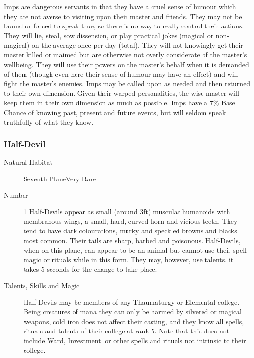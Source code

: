\begin{multicols}{2}
\begin{description}
\setlength\itemsep{0pt}

\item[Comments]Imps are dangerous servants in that they have a cruel sense
of humour which they are not averse to visiting upon their master and
friends.  They may not be bound or forced to speak true, so there is
no way to really control their actions.  They will lie, steal, sow
dissension, or play practical jokes (magical or non-magical) on the
average once per day (total).  They will not knowingly get their
master killed or maimed but are otherwise not overly considerate of
the master's wellbeing.  They will use their powers on the master's
behalf when it is demanded of them (though even here their sense of
humour may have an effect) and will fight the master's enemies.  Imps
may be called upon as needed and then returned to their own dimension.
Given their warped personalities, the wise master will keep them in
their own dimension as much as possible.  Imps have a 7\% Base
Chance of knowing past, present and future events, but will seldom
speak truthfully of what they know.

\end{description}

\subsubsection{Half-Devil}

\begin{description}
\item[Natural Habitat]Seventh PlaneVery Rare

\item[Number] 1
Half-Devils appear as small (around 3ft) muscular humanoids with
membranous wings, a small, hard, curved horn and vicious teeth.  They
tend to have dark colourations, murky and speckled browns and blacks
most common.  Their tails are sharp, barbed and poisonous.
Half-Devils, when on this plane, can appear to be an animal but cannot
use their spell magic or rituals while in this form.  They may,
however, use talents.  it takes 5 seconds for the change to take
place.

\item[Talents, Skills and Magic]Half-Devils may be members of any Thaumaturgy or Elemental
college.  Being creatures of mana they can only be harmed by silvered
or magical weapons, cold iron does not affect their casting, and they
know all spells, rituals and talents of their college at rank 5.  Note
that this does not include Ward, Investment, or other spells and
rituals not intrinsic to their college.


\end{description}
\end{multicols}
